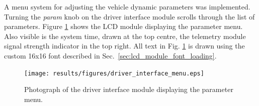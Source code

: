 A menu system for adjusting the vehicle dynamic parameters was implemented. Turning the \emph{param} knob on the driver interface module scrolls through the list of parameters. Figure \ref{fig:driver_interface_menu} shows the LCD module displaying the parameter menu. Also visible is the system time, drawn at the top centre, the telemetry module signal strength indicator in the top right. All text in Fig. \ref{fig:driver_interface_menu} is drawn using the custom 16x16 font described in Sec.\ \ref{sec:lcd_module_font_loading}.

\begin{figure}[h!]
 \centering
 \texttt{[image: results/figures/driver\_interface\_menu.eps]}
 \caption{Photograph of the driver interface module displaying the parameter menu.}
 \label{fig:driver_interface_menu}
\end{figure}
